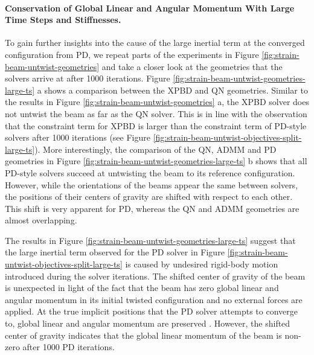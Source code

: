 \paragraph{Conservation of Global Linear and Angular Momentum With Large Time Steps and Stiffnesses.}
To gain further insights into the cause of the large inertial term at the converged configuration from PD, we repeat parts of the 
experiments in Figure \ref{fig:strain-beam-untwist-geometries} and take a closer look at the geometries that the solvers arrive at after 1000 
iterations. Figure \ref{fig:strain-beam-untwist-geometries-large-ts} a shows a comparison between the XPBD and QN geometries. Similar to the 
results in Figure \ref{fig:strain-beam-untwist-geometries} a, the XPBD solver does not untwist the beam as far as the QN solver. This is in 
line with the observation that the constraint term for XPBD is larger than the constraint term of PD-style solvers after 1000 iterations (see 
Figure \ref{fig:strain-beam-untwist-objectives-split-large-ts}). More interestingly, the comparison of the QN, ADMM and PD geometries in 
Figure \ref{fig:strain-beam-untwist-geometries-large-ts} b shows that all PD-style solvers succeed at untwisting the beam to its reference 
configuration. However, while the orientations of the beams appear the same between solvers, the positions of their centers of gravity 
are shifted with respect to each other. This shift is very apparent for PD, whereas the QN and ADMM geometries are almost overlapping.

The results in Figure \ref{fig:strain-beam-untwist-geometries-large-ts} suggest that the large inertial term observed for the PD solver in 
Figure \ref{fig:strain-beam-untwist-objectives-split-large-ts} is caused by undesired rigid-body motion introduced during the solver iterations. 
The shifted center of gravity of the beam is unexpected in light of the fact that the beam has zero global linear and angular momentum in 
its initial twisted configuration and no external forces are applied. At the true implicit positions that the PD solver attempts to converge to, global 
linear and angular momentum are preserved \cite{bouaziz2014}. However, the shifted center of gravity indicates that the global linear 
momentum of the beam is non-zero after 1000 PD iterations.

